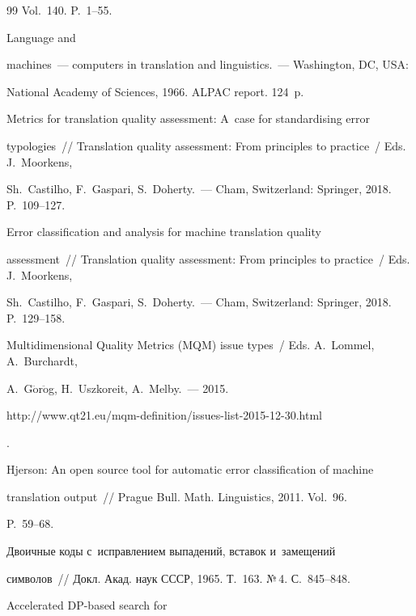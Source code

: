 {{\begin{thebibliography}{99}
Vol.~140. P.~1--55.


 Language and 

machines~--- computers in translation and linguistics.~--- Washington, DC, USA: 

National Academy of Sciences, 1966.   ALPAC report. 124~p.


 Metrics for translation quality assessment: A~case for standardising error 

typologies~/\!\!/ Translation quality assessment: From principles to practice~/ Eds. J.~Moorkens, 

Sh.~Castilho, F.~Gaspari, S.~Doherty.~--- Cham, Switzerland: Springer, 2018. P.~109--127.


 Error classification and analysis for machine translation quality 

assessment~/\!\!/ Translation quality assessment: From principles to practice~/ Eds. J.~Moorkens, 

Sh.~Castilho, F.~Gaspari, S.~Doherty.~--- Cham, Switzerland: Springer, 2018. P.~129--158.


Multidimensional Quality Metrics (MQM) issue types~/ Eds. A.~Lommel, A.~Burchardt, 

A.~G$\ddot{\mbox{o}}$r$\ddot{\mbox{o}}$g, H.~Uszkoreit, A.~Melby.~--- 2015.  {\sf 

http://www.qt21.eu/mqm-definition/issues-list-2015-12-30.html}.


 Hjerson: An open source tool for automatic error classification of machine 

translation output~/\!\!/ Prague Bull. Math. Linguistics, 2011. Vol.~96.  

P.~59--68.


 Двоичные коды с~исправлением выпадений, вставок и~замещений 

символов~/\!\!/ Докл. Акад. наук СССР, 1965. Т.~163. №\,4. С.~845--848.


 Accelerated DP-based search for 


\end{thebibliography}}}
